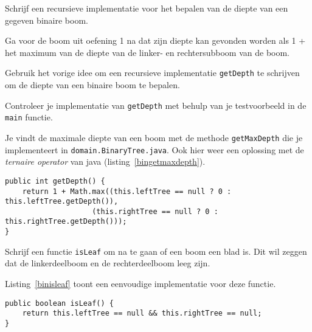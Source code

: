 \begin{oef}
\code Schrijf een recursieve implementatie voor het bepalen van de diepte van een gegeven binaire boom. 
\begin{oefenumerate}
	\item Ga voor de boom uit oefening 1 na dat zijn diepte kan gevonden worden als 1 + het maximum van de diepte van de linker- en rechtersubboom van de boom.
	\item Gebruik het vorige idee om een recursieve implementatie \verb=getDepth= te schrijven om de diepte van een binaire boom te bepalen.
	\item Controleer je implementatie van \verb=getDepth= met behulp van je testvoorbeeld in de \verb=main= functie.
\end{oefenumerate}
\begin{opl}
Je vindt de maximale diepte van een boom met de methode \verb+getMaxDepth+ die je implementeert in \verb+domain.BinaryTree.java+. Ook hier weer een oplossing met de \emph{ternaire operator} van java (listing~\ref{bingetmaxdepth}).
\begin{lstlisting}[caption={De diepte van een binaire boom}, label=bingetmaxdepth]
public int getDepth() {
	return 1 + Math.max((this.leftTree == null ? 0 : this.leftTree.getDepth()), 
					(this.rightTree == null ? 0 : this.rightTree.getDepth()));
}
\end{lstlisting}

\end{opl}
\end{oef}


\begin{oef}
\code Schrijf een functie \verb=isLeaf= om na te gaan of een boom een blad is. Dit wil zeggen dat de linkerdeelboom en de rechterdeelboom leeg zijn.
\begin{opl}
Listing~\ref{binisleaf} toont een eenvoudige implementatie voor deze functie.
\begin{lstlisting}[caption={Is een knoop een blad?}, label=binisleaf]
public boolean isLeaf() {
	return this.leftTree == null && this.rightTree == null;
}
\end{lstlisting}
\end{opl}
\end{oef}





